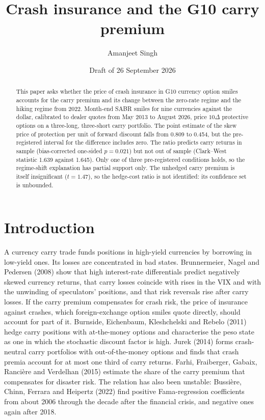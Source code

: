\documentclass[11pt]{article}
\title{Crash insurance and the G10 carry premium}
\author{Amanjeet Singh}
\date{Draft of 26 September 2026}
\theoremstyle{result}
\newcommand{\D}{\Delta}
\begin{document}
\maketitle

\begin{abstract}
\noindent This paper asks whether the price of crash insurance in G10 currency option smiles accounts for the carry premium and its change between the zero-rate regime and the hiking regime from 2022. Month-end SABR smiles for nine currencies against the dollar, calibrated to dealer quotes from May 2013 to August 2026, price $10\D$ protective options on a three-long, three-short carry portfolio. The point estimate of the skew price of protection per unit of forward discount falls from 0.809 to 0.454, but the pre-registered interval for the difference includes zero. The ratio predicts carry returns in sample (bias-corrected one-sided $p=0.021$) but not out of sample (Clark--West statistic 1.639 against 1.645). Only one of three pre-registered conditions holds, so the regime-shift explanation has partial support only. The unhedged carry premium is itself insignificant ($t=1.47$), so the hedge-cost ratio is not identified: its confidence set is unbounded.
\end{abstract}

\section{Introduction}

A currency carry trade funds positions in high-yield currencies by borrowing in low-yield ones. Its losses are concentrated in bad states. Brunnermeier, Nagel and Pedersen (2008) show that high interest-rate differentials predict negatively skewed currency returns, that carry losses coincide with rises in the VIX and with the unwinding of speculators' positions, and that risk reversals rise after carry losses. If the carry premium compensates for crash risk, the price of insurance against crashes, which foreign-exchange option smiles quote directly, should account for part of it. Burnside, Eichenbaum, Kleshchelski and Rebelo (2011) hedge carry positions with at-the-money options and characterise the peso state as one in which the stochastic discount factor is high. Jurek (2014) forms crash-neutral carry portfolios with out-of-the-money options and finds that crash premia account for at most one third of carry returns. Farhi, Fraiberger, Gabaix, Ranci\`ere and Verdelhan (2015) estimate the share of the carry premium that compensates for disaster risk. The relation has also been unstable: Bussi\`ere, Chinn, Ferrara and Heipertz (2022) find positive Fama-regression coefficients from about 2006 through the decade after the financial crisis, and negative ones again after 2018.
\end{document}
